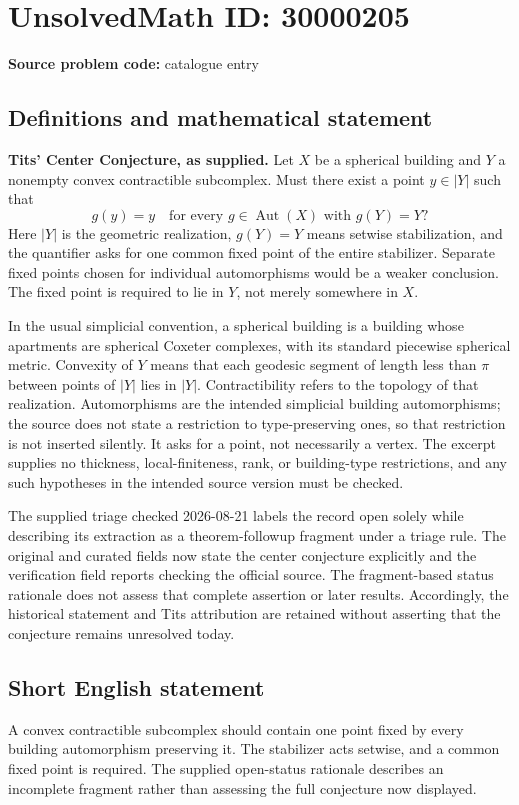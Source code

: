 \documentclass[11pt]{article}
\begin{document}
\section*{UnsolvedMath ID: 30000205}
\textbf{Source problem code:} catalogue entry
\subsection{Definitions and mathematical statement}
\textbf{Tits' Center Conjecture, as supplied.} Let \(X\) be a spherical building and \(Y\) a nonempty convex contractible subcomplex. Must there exist a point \(y\in|Y|\) such that\[g(y)=y\quad\text{for every }g\in\operatorname{Aut}(X)\text{ with }g(Y)=Y?\] Here \(|Y|\) is the geometric realization, \(g(Y)=Y\) means setwise stabilization, and the quantifier asks for one common fixed point of the entire stabilizer. Separate fixed points chosen for individual automorphisms would be a weaker conclusion. The fixed point is required to lie in \(Y\), not merely somewhere in \(X\).\par In the usual simplicial convention, a spherical building is a building whose apartments are spherical Coxeter complexes, with its standard piecewise spherical metric. Convexity of \(Y\) means that each geodesic segment of length less than \(\pi\) between points of \(|Y|\) lies in \(|Y|\). Contractibility refers to the topology of that realization. Automorphisms are the intended simplicial building automorphisms; the source does not state a restriction to type-preserving ones, so that restriction is not inserted silently. It asks for a point, not necessarily a vertex. The excerpt supplies no thickness, local-finiteness, rank, or building-type restrictions, and any such hypotheses in the intended source version must be checked.\par The supplied triage checked 2026-08-21 labels the record open solely while describing its extraction as a theorem-followup fragment under a triage rule. The original and curated fields now state the center conjecture explicitly and the verification field reports checking the official source. The fragment-based status rationale does not assess that complete assertion or later results. Accordingly, the historical statement and Tits attribution are retained without asserting that the conjecture remains unresolved today.
\subsection{Short English statement}
A convex contractible subcomplex should contain one point fixed by every building automorphism preserving it. The stabilizer acts setwise, and a common fixed point is required. The supplied open-status rationale describes an incomplete fragment rather than assessing the full conjecture now displayed.
\end{document}
